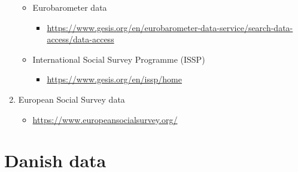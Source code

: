 \documentclass[
]{book}
\providecommand{\tightlist}{%
  \setlength{\itemsep}{0pt}\setlength{\parskip}{0pt}}
\begin{document}
\begin{enumerate}
  \begin{itemize}
  \tightlist
  \item
    Eurobarometer data

    \begin{itemize}
    \tightlist
    \item
      \url{https://www.gesis.org/en/eurobarometer-data-service/search-data-access/data-access}
    \end{itemize}
  \item
    International Social Survey Programme (ISSP)

    \begin{itemize}
    \tightlist
    \item
      \url{https://www.gesis.org/en/issp/home}
    \end{itemize}
  \end{itemize}
\item
  European Social Survey data

  \begin{itemize}
  \tightlist
  \item
    \url{https://www.europeansocialsurvey.org/}
  \end{itemize}
\end{enumerate}

\hypertarget{danish-data}{%
\section{Danish data}\label{danish-data}}
\end{document}
